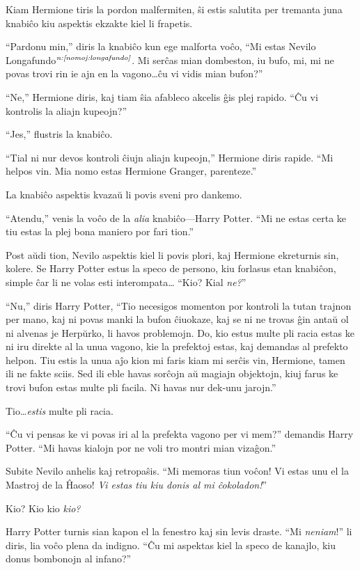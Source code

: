 Kiam Hermione tiris la pordon malfermiten, ŝi estis salutita per
tremanta juna knabiĉo kiu aspektis ekzakte kiel li frapetis.

``Pardonu min,'' diris la knabiĉo kun ege malforta voĉo, ``Mi estas
Nevilo Longafundo$^{\textit{n:\ref{nomoj:longafundo}}}$. Mi serĉas mian dombeston, iu
bufo, mi, mi ne povas trovi rin ie ajn en la vagono\ldots ĉu vi vidis
mian bufon?''

``Ne,'' Hermione diris, kaj tiam ŝia afableco akcelis ĝis plej
rapido. ``Ĉu vi kontrolis la aliajn kupeojn?''

``Jes,'' flustris la knabiĉo.

``Tial ni nur devos kontroli ĉiujn aliajn kupeojn,'' Hermione diris
rapide. ``Mi helpos vin. Mia nomo estas Hermione Granger, parenteze.''

La knabiĉo aspektis kvazaŭ li povis sveni pro dankemo.

``Atendu,'' venis la voĉo de la \emph{alia} knabiĉo—Harry Potter. ``Mi
ne estas certa ke tiu estas la plej bona maniero por fari tion.''

Post aŭdi tion, Nevilo aspektis kiel li povis plori, kaj Hermione
ekreturnis sin, kolere. Se Harry Potter estus la speco de persono, kiu
forlasus etan knabiĉon, simple ĉar li ne volas esti interompata\ldots
``Kio? Kial \emph{ne?}''

``Nu,'' diris Harry Potter, ``Tio necesigos momenton por kontroli la
tutan trajnon per mano, kaj ni povas manki la bufon ĉiuokaze, kaj se
ni ne trovas ĝin antaŭ ol ni alvenas je Herpŭrko, li havos
problemojn. Do, kio estus multe pli racia estas ke ni iru direkte al
la unua vagono, kie la prefektoj estas, kaj demandas al prefekto
helpon. Tiu estis la unua aĵo kion mi faris kiam mi serĉis vin,
Hermione, tamen ili ne fakte sciis. Sed ili eble havas sorĉojn aŭ
magiajn objektojn, kiuj farus ke trovi bufon estas multe pli
facila. Ni havas nur dek-unu jarojn.''


Tio\ldots \emph{estis} multe pli racia.

``Ĉu vi pensas ke vi povas iri al la prefekta vagono per vi mem?''
demandis Harry Potter. ``Mi havas kialojn por ne voli tro montri mian
vizaĝon.''

Subite Nevilo anhelis kaj retropaŝis. ``Mi memoras tiun voĉon! Vi
estas unu el la Mastroj de la Ĥaoso! \emph{Vi estas tiu kiu donis al
  mi ĉokoladon!}''

Kio? Kio kio \emph{kio?}

Harry Potter turnis sian kapon el la fenestro kaj sin levis
draste. ``Mi \emph{neniam}!'' li diris, lia voĉo plena da
indigno. ``Ĉu mi aspektas kiel la speco de kanajlo, kiu donus
bombonojn al infano?''


